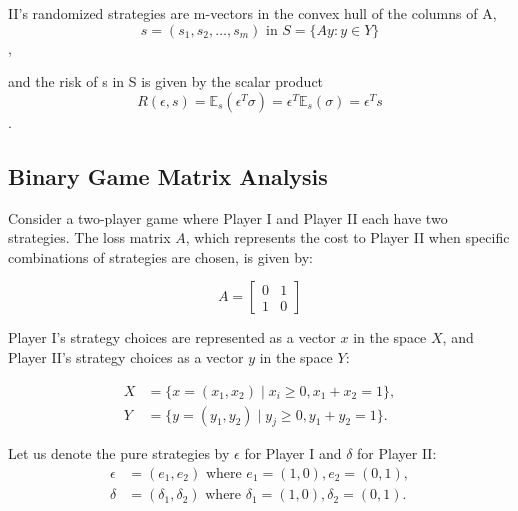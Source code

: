 \documentclass[11pt]{article}
\numberwithin{equation}{section}
\theoremstyle{boldStyle}
\begin{document}
II's randomized strategies are m-vectors in the convex hull of the columns of A, 
\begin{equation} \label{eq:2.7}
    s = (s_1, s_2, \ldots, s_m) \text{ in } S = \{Ay : y \in Y \}
\end{equation},

and the risk of s in S is given by the scalar product
\begin{equation} \label{eq:2.8}
    R(\epsilon, s) = \mathbb{E}_s(\epsilon^T \sigma) = \epsilon^T \mathbb{E}_s(\sigma) = \epsilon^T s
\end{equation}.



\subsection{Binary Game Matrix Analysis}

Consider a two-player game where Player I and Player II each have two strategies. The loss matrix \( A \), which represents the cost to Player II when specific combinations of strategies are chosen, is given by:

\begin{equation*}
    A = \begin{bmatrix}
    0 & 1 \\
    1 & 0
    \end{bmatrix}
\end{equation*}

Player I's strategy choices are represented as a vector \( x \) in the space \( X \), and Player II's strategy choices as a vector \( y \) in the space \( Y \):

\begin{equation*} \label{eq:strategies}
    \begin{aligned}
        X &= \{x = (x_1, x_2) \mid x_i \geq 0, x_1 + x_2 = 1\}, \\
        Y &= \{y = (y_1, y_2) \mid y_j \geq 0, y_1 + y_2 = 1\}.
    \end{aligned}
\end{equation*}

Let us denote the pure strategies by \( \epsilon \) for Player I and \( \delta \) for Player II:
\begin{equation*} \label{eq:pure_strategies}
    \begin{aligned}
        \epsilon &= (e_1, e_2) \text{ where } e_1 = (1, 0), e_2 = (0, 1), \\
        \delta &= (\delta_1, \delta_2) \text{ where } \delta_1 = (1, 0), \delta_2 = (0, 1).
    \end{aligned}
\end{equation*}
\end{document}
